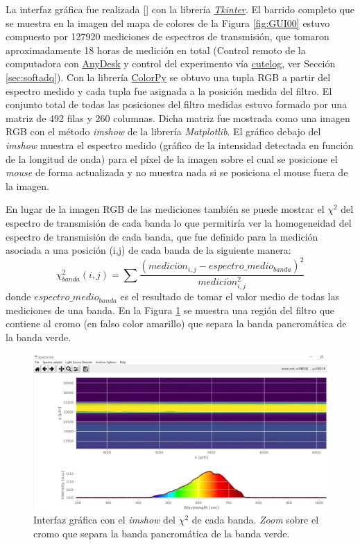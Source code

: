 La interfaz gráfica fue realizada [\href{https://github.com/jrr1984/Prototipo0\_S-D\_SpectralGUI/blob/master/spectral\_gui/main.py}{\faGithub}] con la librería	 \href{https://wiki.python.org/moin/TkInter}{\textit{Tkinter}}. El barrido completo que se muestra en la imagen del mapa de colores de la Figura \ref{fig:GUI00} estuvo compuesto por 127920 mediciones de espectros de transmisión, que tomaron aproximadamente 18 horas de medición en total (Control remoto de la computadora con \href{https://anydesk.com/es}{AnyDesk} y control del experimento vía \href{https://pypi.org/project/cutelog/}{cutelog}, ver Sección \ref{sec:softadq}). Con la librería \href{https://pypi.org/project/colorpy/}{ColorPy} se obtuvo una tupla RGB a partir del espectro medido y cada tupla fue asignada a la posición medida del filtro. El conjunto total de todas las posiciones del filtro medidas estuvo formado por una matriz de 492 filas y 260 columnas. Dicha matriz fue mostrada como una imagen RGB con el método \textit{imshow} de la librería \textit{Matplotlib}. El gráfico debajo del \textit{imshow} muestra el espectro medido (gráfico de la intensidad detectada en función de la longitud de onda) para el píxel de la imagen sobre el cual se posicione el \textit{mouse} de forma actualizada y no muestra nada si se posiciona el mouse fuera de la imagen. 

En lugar de la imagen RGB de las mediciones también se puede mostrar el $\chi^{2}$ del espectro de transmisión de cada banda lo que permitiría ver la homogeneidad del espectro de transmisión de cada banda, que fue definido para la medición asociada a una posición (i,j) de cada banda de la siguiente manera:
\begin{equation}
\chi^{2}_{banda}(i,j) = \sum \frac{(medici\acute{o}n_{i,j} - espectro\_medio_{banda})^{2}}{medici\acute{o}n^{2}_{i,j}}
\end{equation}
donde $espectro\_medio_{banda}$ es el resultado de tomar el valor medio de todas las mediciones de una banda. En la Figura \ref{fig:GUI01} se muestra una región del filtro que contiene al cromo (en falso color amarillo) que separa la banda pancromática de la banda verde.
\begin{figure}[H]
	\centering
	\includegraphics[scale=0.41]{Figs/microespectrometro/chidisp.png}
	\caption{Interfaz gráfica con el \textit{imshow} del $\chi^{2}$ de cada banda. \textit{Zoom} sobre el cromo que separa la banda pancromática de la banda verde.}
	\label{fig:GUI01}
\end{figure}

